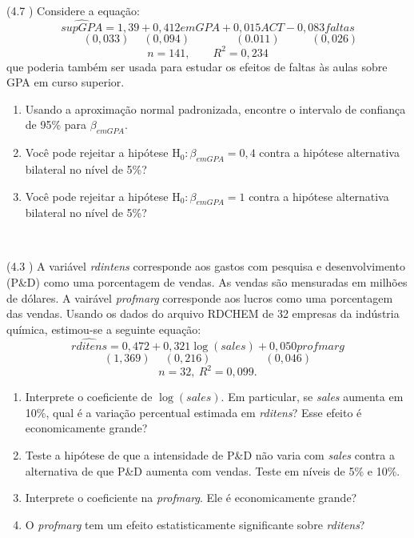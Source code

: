 \documentclass[12pt,letterpaper, onecolumn]{exam}
\begin{document}
\begin{questions}

    \question\qstar (4.7 \cite{wooldridge2010}) Considere a equação: \[
    \widehat{supGPA} = 1,39 + 0,412emGPA + 0,015ACT -0,083 faltas
    \]\vspace{-2.0em}\[
    \phantom{\widehat{su-}} (0,033)  \phantom{ + } (0,094) \phantom{----} (0.011)\phantom{ ---} (0,026)
    \]\vspace{-1.0em}\[
    n = 141,\quad \quad  R^2 =0,234
    \] que poderia também ser usada para estudar os efeitos de faltas às aulas sobre GPA em curso superior.
    \begin{enumerate}[label=(\alph*)]
    \item Usando a aproximação normal padronizada, encontre o intervalo de confiança de 95\% para $\beta_{emGPA}$.
    \item Você pode rejeitar a hipótese $\text{H}_0: \beta_{emGPA} = 0,4$ contra a hipótese alternativa bilateral no nível de 5\%?
    \item Você pode rejeitar a hipótese $\text{H}_0: \beta_{emGPA} = 1$ contra a hipótese alternativa bilateral no nível de 5\%?
    \end{enumerate}

    \
\
\


\question (4.3 \citep{wooldridge2016}) A variável \textit{rdintens} corresponde aos gastos com pesquisa e desenvolvimento (P\&D) como uma porcentagem de vendas. As vendas são mensuradas em milhões de dólares. A vairável \textit{profmarg} corresponde aos lucros como uma porcentagem das vendas.
Usando os dados do arquivo RDCHEM de 32 empresas da indústria química, estimou-se a seguinte equação:
\begin{equation*}
    \widehat{rditens} = 0,472 + 0,321\log(sales) + 0,050profmarg
\end{equation*} \vspace{-2em}
\begin{equation*}
    \phantom{} (1,369)\phantom{-} (0,216) \phantom{-----} (0,046)
\end{equation*}\begin{equation*}
    n = 32, \ R^2 = 0,099. 
\end{equation*}
\begin{enumerate}[label = (\alph*)]
    \item Interprete o coeficiente de $\log(sales)$. Em particular, se \textit{sales} aumenta em 10\%, qual é a variação percentual estimada em \textit{rditens}? Esse efeito é economicamente grande?
    \item Teste a hipótese de que a intensidade de P\&D não varia com \textit{sales} contra a alternativa de que P\&D aumenta com vendas. Teste em níveis de 5\% e 10\%.
    \item Interprete o coeficiente na \textit{profmarg}. Ele é economicamente grande?
    \item O \textit{profmarg} tem um efeito estatisticamente significante sobre \textit{rditens}?
\end{enumerate}
\
\



\end{questions}
\end{document}
